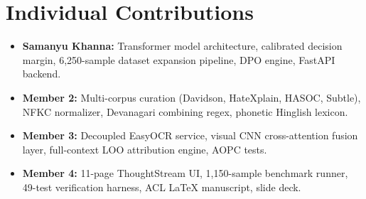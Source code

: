 \documentclass[10pt,twocolumn]{article}
\begin{document}
\section{Individual Contributions}
\begin{itemize}
    \item \textbf{Samanyu Khanna:} Transformer model architecture, calibrated decision margin, 6,250-sample dataset expansion pipeline, DPO engine, FastAPI backend.
    \item \textbf{Member 2:} Multi-corpus curation (Davidson, HateXplain, HASOC, Subtle), NFKC normalizer, Devanagari combining regex, phonetic Hinglish lexicon.
    \item \textbf{Member 3:} Decoupled EasyOCR service, visual CNN cross-attention fusion layer, full-context LOO attribution engine, AOPC tests.
    \item \textbf{Member 4:} 11-page ThoughtStream UI, 1,150-sample benchmark runner, 49-test verification harness, ACL LaTeX manuscript, slide deck.
\end{itemize}
\end{document}
